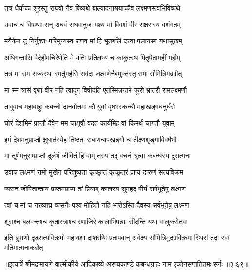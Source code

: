 \twolineshloka
{तत्र धैर्याच्च शूरस्तु राघवो नैव विव्यथे}
{बाल्यादनाश्रयाच्चैव लक्ष्मणस्त्वभिविव्यथे} %

\twolineshloka
{उवाच च विषण्णः सन् राघवं राघवानुजः}
{पश्य मां विवशं वीर राक्षसस्य वशंगतम्} %

\twolineshloka
{मयैकेन तु निर्युक्तः परिमुच्यस्व राघव}
{मां हि भूतबलिं दत्त्वा पलायस्व यथासुखम्} %

\twolineshloka
{अधिगन्तासि वैदेहीमचिरेणेति मे मतिः}
{प्रतिलभ्य च काकुत्स्थ पितृपैतामहीं महीम्} %

\twolineshloka
{तत्र मां राम राज्यस्थः स्मर्तुमर्हसि सर्वदा}
{लक्ष्मणेनैवमुक्तस्तु रामः सौमित्रिमब्रवीत्} %

\twolineshloka
{मा स्म त्रासं वृथा वीर नहि त्वादृग् विषीदति}
{एतस्मिन्नन्तरे क्रूरो भ्रातरौ रामलक्ष्मणौ} %

\twolineshloka
{तावुवाच महाबाहुः कबन्धो दानवोत्तमः}
{कौ युवां वृषभस्कन्धौ महाखड्गधनुर्धरौ} %

\twolineshloka
{घोरं देशमिमं प्राप्तौ दैवेन मम चाक्षुषौ}
{वदतं कार्यमिह वां किमर्थं चागतौ युवाम्} %

\twolineshloka
{इमं देशमनुप्राप्तौ क्षुधार्तस्येह तिष्ठतः}
{सबाणचापखड्गौ च तीक्ष्णशृङ्गाविवर्षभौ} %

\twolineshloka
{मां तूर्णमनुसम्प्राप्तौ दुर्लभं जीवितं हि वाम्}
{तस्य तद् वचनं श्रुत्वा कबन्धस्य दुरात्मनः} %

\twolineshloka
{उवाच लक्ष्मणं रामो मुखेन परिशुष्यता}
{कृच्छ्रात् कृच्छ्रतरं प्राप्य दारुणं सत्यविक्रम} %

\twolineshloka
{व्यसनं जीवितान्ताय प्राप्तमप्राप्य तां प्रियाम्}
{कालस्य सुमहद् वीर्यं सर्वभूतेषु लक्ष्मण} %

\twolineshloka
{त्वां च मां च नरव्याघ्र व्यसनैः पश्य मोहितौ}
{नहि भारोऽस्ति दैवस्य सर्वभूतेषु लक्ष्मण} %

\twolineshloka
{शूराश्च बलवन्तश्च कृतास्त्राश्च रणाजिरे}
{कालाभिपन्नाः सीदन्ति यथा वालुकसेतवः} %

\twolineshloka
{इति ब्रुवाणो दृढसत्यविक्रमो महायशा दाशरथिः प्रतापवान्}
{अवेक्ष्य सौमित्रिमुदग्रविक्रमः स्थिरां तदा स्वां मतिमात्मनाकरोत्} %


॥इत्यार्षे श्रीमद्रामायणे वाल्मीकीये आदिकाव्ये अरण्यकाण्डे कबन्धग्राहः नाम एकोनसप्ततितमः सर्गः ॥३-६९॥
